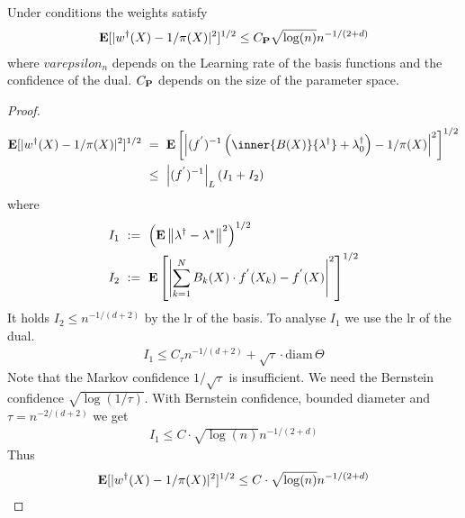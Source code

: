 \begin{theorem}
  Under conditions
  the weights satisfy
  \begin{gather}
    \E
    [
    |
    w^\dagger(X)
    -
    1/\pi(X)
    |
    ^2
    ]
    ^{1/2}
    \le
    C_\P
  \sqrt{\log(n)}
  n^{-1/(2+d)}
  \end{gather}
  where 
  $varepsilon_n$ depends on the Learning rate of the basis functions
  and the confidence of the dual.
  $C_\P$ depends on the size of the parameter space.
\end{theorem}
\begin{proof}
  \begin{align}
    \E
    [
    |
    w^\dagger(X)
    -
    1/\pi(X)
    |
    ^2
    ]
    ^{1/2}
    &
    \ 
    =
    \ 
    \E
    \left[ 
    \left| 
    (f^{'})^{-1}
    \left( 
      \inner
      {B(X)}
      {\lambda^\dagger}
      +
      \lambda_0^\dagger
    \right)
    -
    1/\pi(X)
    \right|
    ^2
    \right]
    ^{1/2}
    \\
    &
    \ 
    \le
    \ 
    \left| 
    (f^{'})^{-1}
    \right|_L
    \left( 
      I_1 + I_2
    \right)
  \end{align}
  where
  \begin{align}
    I_1
    & 
    \ 
    :=
    \ 
    \left( 
    \E\norm{\lambda^\dagger-\lambda^*}^2
    \right)
    ^{1/2}
    \\
    I_2
    & 
    \ 
    :=
    \ 
      \E
      \left[ 
        \left| 
        \sum_{k=1}^{N} 
        B_k(X)\cdot 
        f^{'}(X_k)
        -
        f^{'}(X)
        \right|
        ^2
      \right]
    ^{1/2}
  \end{align}
  It holds 
  $I_2\le n^{-1/(d+2)}$
  by the lr of the basis.
  To analyse $I_1$ we use the lr of the dual.
  \begin{align}
   I_1
   \le
   C_\tau
   n^{-1/(d+2)}
   +
   \sqrt{\tau}
   \cdot
   \mathrm{diam}\,\Theta
  \end{align}
Note that the Markov confidence $1/\sqrt{\tau}$ is insufficient. 
We need the Bernstein confidence $\sqrt{\log(1/\tau)}$. 
With Bernstein confidence, bounded diameter and $\tau=n^{-2/(d+2)}$
we get
\begin{gather}
  I_1
  \le
  C
  \cdot
  \sqrt{\log(n)}
  n^{-1/(2+d)}
\end{gather}
Thus
\begin{gather}
    \E
    [
    |
    w^\dagger(X)
    -
    1/\pi(X)
    |
    ^2
    ]
    ^{1/2}
    \le
    C
    \cdot
  \sqrt{\log(n)}
  n^{-1/(2+d)}
\end{gather}
\end{proof}
